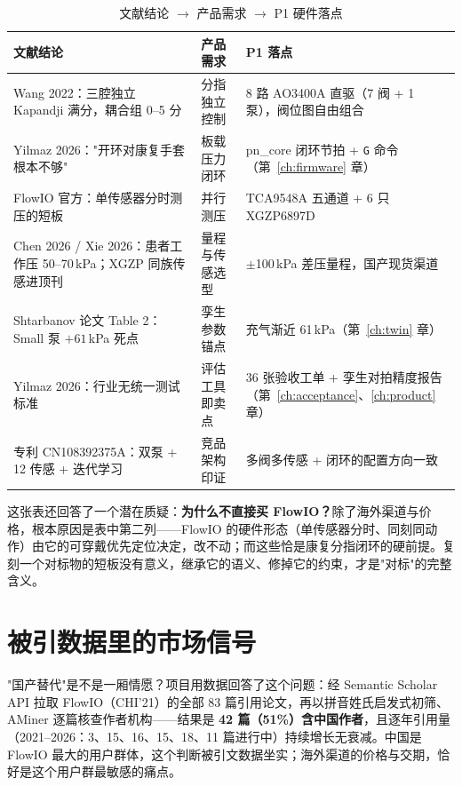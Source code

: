 \begin{table}[htbp]
  \centering
  \caption{文献结论 $\to$ 产品需求 $\to$ P1 硬件落点}
  \label{tab:intro-reqs}
  \begin{tabular}{lp{4.4cm}p{4.8cm}}
    \toprule
    文献结论 & 产品需求 & P1 落点 \\
    \midrule
    Wang 2022：三腔独立 Kapandji 满分，耦合组 0--5 分 & 分指独立控制 & 8 路 AO3400A 直驱（7 阀 + 1 泵），阀位图自由组合 \\
    Yilmaz 2026："开环对康复手套根本不够" & 板载压力闭环 & pn\_core 闭环节拍 + \texttt{G} 命令（第~\ref{ch:firmware} 章） \\
    FlowIO 官方：单传感器分时测压的短板 & 并行测压 & TCA9548A 五通道 + 6 只 XGZP6897D \\
    Chen 2026 / Xie 2026：患者工作压 50--70\,kPa；XGZP 同族传感进顶刊 & 量程与传感选型 & $\pm$100\,kPa 差压量程，国产现货渠道 \\
    Shtarbanov 论文 Table 2：Small 泵 $+61$\,kPa 死点 & 孪生参数锚点 & 充气渐近 61\,kPa（第~\ref{ch:twin} 章） \\
    Yilmaz 2026：行业无统一测试标准 & 评估工具即卖点 & 36 张验收工单 + 孪生对拍精度报告（第~\ref{ch:acceptance}、\ref{ch:product} 章） \\
    专利 CN108392375A：双泵 + 12 传感 + 迭代学习 & 竞品架构印证 & 多阀多传感 + 闭环的配置方向一致 \\
    \bottomrule
  \end{tabular}
\end{table}

这张表还回答了一个潜在质疑：\textbf{为什么不直接买 FlowIO？}除了海外渠道与价格，根本原因是表中第二列——FlowIO 的硬件形态（单传感器分时、同刻同动作）由它的可穿戴优先定位决定，改不动；而这些恰是康复分指闭环的硬前提。复刻一个对标物的短板没有意义，继承它的语义、修掉它的约束，才是"对标"的完整含义。

\section{被引数据里的市场信号}
\label{sec:intro-signal}

"国产替代"是不是一厢情愿？项目用数据回答了这个问题：经 Semantic Scholar API 拉取 FlowIO（CHI'21）的全部 83 篇引用论文，再以拼音姓氏启发式初筛、AMiner 逐篇核查作者机构——结果是 \textbf{42 篇（51\%）含中国作者}，且逐年引用量（2021--2026：3、15、16、15、18、11 篇进行中）持续增长无衰减。中国是 FlowIO 最大的用户群体，这个判断被引文数据坐实；海外渠道的价格与交期，恰好是这个用户群最敏感的痛点。

